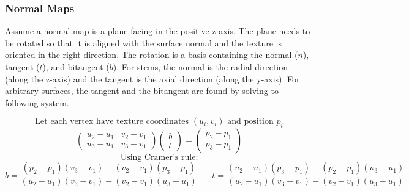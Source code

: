 \documentclass[10pt]{article}
\newcommand\m[1]{\begin{pmatrix}#1\end{pmatrix}}
\begin{document}
\subsubsection{Normal Maps}

Assume a normal map is a plane facing in the positive z-axis. The plane needs to be rotated so that it is aligned with the surface normal and the texture is oriented in the right direction. The rotation is a basis containing the normal ($ n $), tangent ($ t $), and bitangent ($ b $). For stems, the normal is the radial direction (along the z-axis) and the tangent is the axial direction (along the y-axis). For arbitrary surfaces, the tangent and the bitangent are found by solving to following system.

\[ \text{Let each vertex have texture coordinates } (u_i, v_i) \text{ and position } p_i \]
\[ \m{u_2-u_1 & v_2-v_1 \\ u_3-u_1 & v_3-v_1} \m{b \\ t} = \m{p_2-p_1 \\ p_3-p_1}  \]
\[ \text{Using Cramer's rule:} \]
\[ b = \frac{(p_2 - p_1)(v_3-v_1)-(v_2-v_1)(p_3-p_1)}{(u_2-u_1)(v_3 - v_1)-(v_2-v_1)(u_3-u_1)} \hspace{20pt}
t = \frac{ (u_2-u_1)(p_3-p_1)-(p_2-p_1)(u_3-u_1)
 }{(u_2-u_1)(v_3-v_1)-(v_2-v_1)(u_3-u_1)}
\]
\end{document}
